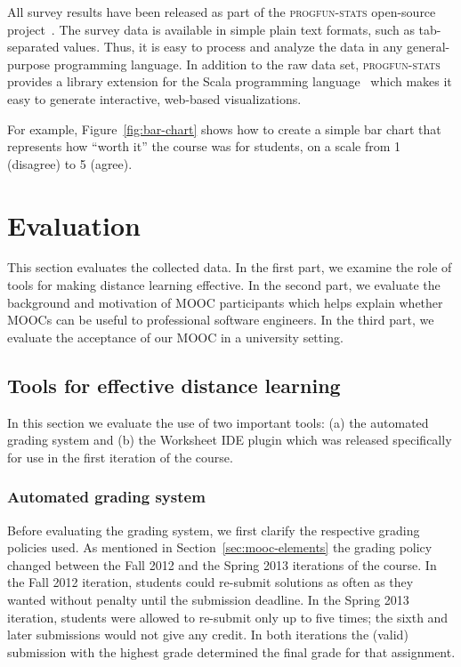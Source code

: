 \documentclass{sig-alternate}
\begin{document}
All survey results have been released as part of the \textsc{progfun-stats} open-source
project~\cite{progfun-stats}. The survey data is available in simple
plain text formats, such  as tab-separated values. Thus, it is easy to process
and analyze the data in any general-purpose programming language. In addition
to the raw data set, \textsc{progfun-stats} provides a library extension for
the Scala programming language~\cite{Odersky-Spoon-Venners07} which makes it
easy to generate interactive, web-based visualizations.

For example, Figure~\ref{fig:bar-chart} shows how to create a simple bar chart
that represents how ``worth it'' the course was for students, on a scale from
1 (disagree) to 5 (agree).

\section{Evaluation}
\label{sec:eval}

This section evaluates the collected data. In the first part, we examine the
role of tools for making distance learning effective. In the second part, we
evaluate the background and motivation of MOOC participants which helps
explain whether MOOCs can be useful to professional software engineers. In the
third part, we evaluate the acceptance of our MOOC in a university setting.

\subsection{Tools for effective distance learning}

In this section we evaluate the use of two important tools: (a) the automated
grading system and (b) the Worksheet IDE plugin which was released
specifically for use in the first iteration of the course.

\subsubsection{Automated grading system}

Before evaluating the grading system, we first clarify the respective grading
policies used. As mentioned in Section~\ref{sec:mooc-elements} the grading
policy changed between the Fall 2012 and the Spring 2013 iterations of the
course. In the Fall 2012 iteration, students could re-submit solutions as
often as they wanted without penalty until the submission deadline. In the
Spring 2013 iteration, students were allowed to re-submit only up to five
times; the sixth and later submissions would not give any credit. In both
iterations the (valid) submission with the highest grade determined the final
grade for that assignment.
\end{document}

